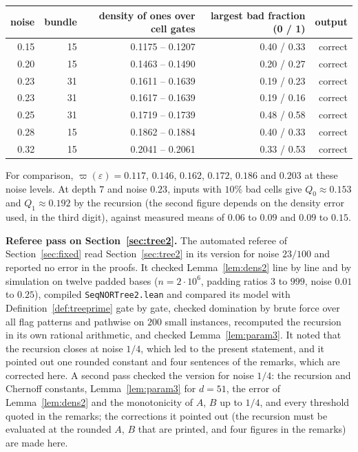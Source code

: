 \documentclass[11pt]{amsart}
\theoremstyle{definition}
\theoremstyle{remark}
\newcommand{\eps}{\varepsilon}
\begin{document}
\begin{center}
\begin{tabular}{rrrrr}
\toprule
noise & bundle & density of ones over cell gates & largest bad fraction (0 / 1) & output\\
\midrule
0.15 & 15 & 0.1175 -- 0.1207 & 0.40 / 0.33 & correct\\
0.20 & 15 & 0.1463 -- 0.1490 & 0.20 / 0.27 & correct\\
0.23 & 31 & 0.1611 -- 0.1639 & 0.19 / 0.23 & correct\\
0.23 & 31 & 0.1617 -- 0.1639 & 0.19 / 0.16 & correct\\
0.25 & 31 & 0.1719 -- 0.1739 & 0.48 / 0.58 & correct\\
0.28 & 15 & 0.1862 -- 0.1884 & 0.40 / 0.33 & correct\\
0.32 & 15 & 0.2041 -- 0.2061 & 0.33 / 0.53 & correct\\
\bottomrule
\end{tabular}
\end{center}

\noindent For comparison, $\varpi(\eps)=0.117$, $0.146$, $0.162$, $0.172$, $0.186$ and $0.203$ at these
noise levels. At depth $7$ and noise $0.23$, inputs with $10\%$ bad cells give $Q_0\approx0.153$ and
$Q_1\approx0.192$ by the recursion (the second figure depends on the density error used, in the
third digit), against measured means of $0.06$ to $0.09$ and $0.09$ to $0.15$.

\medskip\noindent\textbf{Referee pass on Section~\ref{sec:tree2}.} The automated referee of
Section~\ref{sec:fixed} read Section~\ref{sec:tree2} in its version for noise $23/100$ and reported
no error in the proofs. It checked Lemma~\ref{lem:dens2} line by line and by simulation on twelve
padded bases ($n=2\cdot10^6$, padding ratios $3$ to $999$, noise $0.01$ to $0.25$), compiled
\texttt{SeqNORTree2.lean} and compared its model with Definition~\ref{def:treeprime} gate by gate,
checked domination by brute force over all flag patterns and pathwise on $200$ small instances,
recomputed the recursion in its own rational arithmetic, and checked Lemma~\ref{lem:param3}. It
noted that the recursion closes at noise $1/4$, which led to the present statement, and it pointed
out one rounded constant and four sentences of the remarks, which are corrected here. A second
pass checked the version for noise $1/4$: the recursion and Chernoff constants, Lemma~\ref{lem:param3}
for $d=51$, the error of Lemma~\ref{lem:dens2} and the monotonicity of $A$, $B$ up to $1/4$, and every
threshold quoted in the remarks; the corrections it pointed out (the recursion must be evaluated at
the rounded $A$, $B$ that are printed, and four figures in the remarks) are made here.
\end{document}
